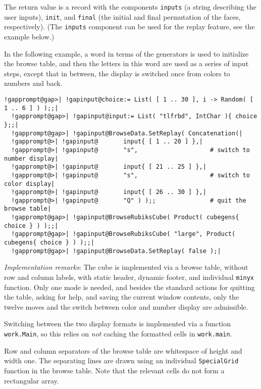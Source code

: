 \documentclass[a4paper,11pt]{report}
\begin{document}
{{{ The return value is a record with the components \texttt{inputs} (a string describing the user inputs), \texttt{init}, and \texttt{final} (the initial and final permutation of the faces, respectively). (The \texttt{inputs} component can be used for the replay feature, see the example below.) 

 In the following example, a word in terms of the generators is used to
initialize the browse table, and then the letters in this word are used as a
series of input steps, except that in between, the display is switched once
from colors to numbers and back. 

 
\begin{Verbatim}[commandchars=!@|,fontsize=\small,frame=single,label=Example]
  !gapprompt@gap>| !gapinput@choice:= List( [ 1 .. 30 ], i -> Random( [ 1 .. 6 ] ) );;|
  !gapprompt@gap>| !gapinput@input:= List( "tlfrbd", IntChar ){ choice };;|
  !gapprompt@gap>| !gapinput@BrowseData.SetReplay( Concatenation(|
  !gapprompt@>| !gapinput@       input{ [ 1 .. 20 ] },|
  !gapprompt@>| !gapinput@       "s",                    # switch to number display|
  !gapprompt@>| !gapinput@       input{ [ 21 .. 25 ] },|
  !gapprompt@>| !gapinput@       "s",                    # switch to color display|
  !gapprompt@>| !gapinput@       input{ [ 26 .. 30 ] },|
  !gapprompt@>| !gapinput@       "Q" ) );;               # quit the browse table|
  !gapprompt@gap>| !gapinput@BrowseRubiksCube( Product( cubegens{ choice } ) );;|
  !gapprompt@gap>| !gapinput@BrowseRubiksCube( "large", Product( cubegens{ choice } ) );;|
  !gapprompt@gap>| !gapinput@BrowseData.SetReplay( false );|
\end{Verbatim}
 \emph{Implementation remarks}: The cube is implemented via a browse table, without row and column labels,
with static header, dynamic footer, and individual \texttt{minyx} function. Only one mode is needed, and besides the standard actions for
quitting the table, asking for help, and saving the current window contents,
only the twelve moves and the switch between color and number display are
admissible. 

 Switching between the two display formats is implemented via a function \texttt{work.Main}, so this relies on \emph{not} caching the formatted cells in \texttt{work.main}. 

 Row and column separators of the browse table are whitespace of height and
width one. The separating lines are drawn using an individual \texttt{SpecialGrid} function in the browse table. Note that the relevant cells do not form a
rectangular array. 

}}}
\end{document}
